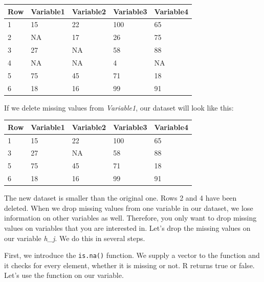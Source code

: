 \documentclass[]{book}
\newenvironment{Shaded}{\begin{snugshade}}{\end{snugshade}}
\newcommand{\KeywordTok}[1]{\textcolor[rgb]{0.13,0.29,0.53}{\textbf{#1}}}
\newcommand{\OperatorTok}[1]{\textcolor[rgb]{0.81,0.36,0.00}{\textbf{#1}}}
\newcommand{\NormalTok}[1]{#1}
\theoremstyle{definition}
\theoremstyle{definition}
\theoremstyle{definition}
\theoremstyle{remark}
\begin{document}
\begin{tabular}{l|l|l|l|l}
\hline
Row & Variable1 & Variable2 & Variable3 & Variable4\\
\hline
1 & 15 & 22 & 100 & 65\\
\hline
2 & NA & 17 & 26 & 75\\
\hline
3 & 27 & NA & 58 & 88\\
\hline
4 & NA & NA & 4 & NA\\
\hline
5 & 75 & 45 & 71 & 18\\
\hline
6 & 18 & 16 & 99 & 91\\
\hline
\end{tabular}

If we delete missing values from \emph{Variable1}, our dataset will look
like this:

\begin{tabular}{l|l|l|l|l}
\hline
Row & Variable1 & Variable2 & Variable3 & Variable4\\
\hline
1 & 15 & 22 & 100 & 65\\
\hline
3 & 27 & NA & 58 & 88\\
\hline
5 & 75 & 45 & 71 & 18\\
\hline
6 & 18 & 16 & 99 & 91\\
\hline
\end{tabular}

The new dataset is smaller than the original one. Rows 2 and 4 have been
deleted. When we drop missing values from one variable in our dataset,
we lose information on other variables as well. Therefore, you only want
to drop missing values on variables that you are interested in. Let's
drop the missing values on our variable \emph{h\_j}. We do this in
several steps.

First, we introduce the \texttt{is.na()} function. We supply a vector to
the function and it checks for every element, whether it is missing or
not. R returns true or false. Let's use the function on our variable.

\begin{Shaded}
\end{Shaded}
\end{document}
